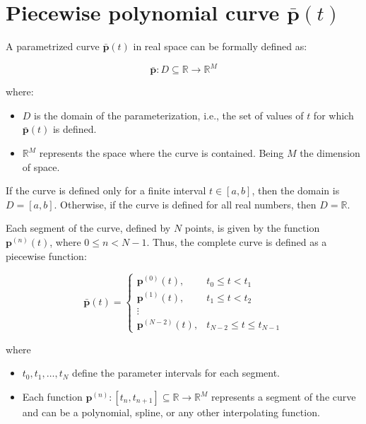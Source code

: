 \section{Piecewise polynomial curve $\mathbf{\bar{p}}(t)$}
\label{sec:curvePiecewise}
A parametrized curve $\mathbf{\bar{p}}(t)$ in real space can be formally defined as:

\begin{equation}
\mathbf{\bar{p}}: D \subseteq \mathbb{R} \to \mathbb{R}^M
\end{equation}

where: 

\begin{itemize}
\item $D$ is the domain of the parameterization, i.e., the set of values of $t$ for which $\mathbf{\bar{p}}(t)$ is defined.  
\item $\mathbb{R}^M$ represents the space where the curve is contained.
Being $M$ the dimension of space.
\end{itemize}

If the curve is defined only for a finite interval $t \in [a, b]$, then the domain is $D = [a, b]$. Otherwise, if the curve is defined for all real numbers, then $D = \mathbb{R}$.  




Each segment of the curve, defined by $N$ points, is given by the function $\mathbf{p}^{(n)}(t)$, where $0 \leq n < N-1$.  
Thus, the complete curve is defined as a piecewise function:

\begin{equation}\label{eq:phatt}
\mathbf{\bar{p}}(t) =
\begin{cases} 
\mathbf{p}^{(0)}(t), & t_0 \leq t < t_1 \\
\mathbf{p}^{(1)}(t), & t_1 \leq t < t_2 \\
\vdots \\
\mathbf{p}^{(N-2)}(t), & t_{N-2} \leq t \leq t_{N-1}
\end{cases}
\end{equation}

where
\begin{itemize}
\item $t_0, t_1, \dots, t_N $ define the parameter intervals for each segment.  
\item Each function $\mathbf{p}^{(n)}: [t_{n},t_{n+1}] \subseteq \mathbb{R} \to \mathbb{R}^M$ represents a segment of the curve and can be a polynomial, spline, or any other interpolating function.  
\end{itemize}



